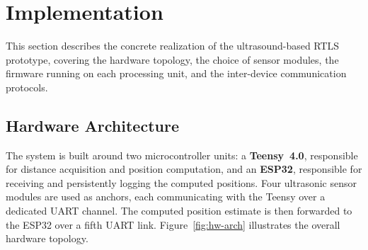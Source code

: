 \section{Implementation}

This section describes the concrete realization of the ultrasound-based RTLS prototype, covering the hardware topology, the choice of sensor modules, the firmware running on each processing unit, and the inter-device communication protocols.

\subsection{Hardware Architecture}

The system is built around two microcontroller units: a \textbf{Teensy~4.0}, responsible for distance acquisition and position computation, and an \textbf{ESP32}, responsible for receiving and persistently logging the computed positions. Four ultrasonic sensor modules are used as anchors, each communicating with the Teensy over a dedicated UART channel. The computed position estimate is then forwarded to the ESP32 over a fifth UART link. Figure~\ref{fig:hw-arch} illustrates the overall hardware topology.

